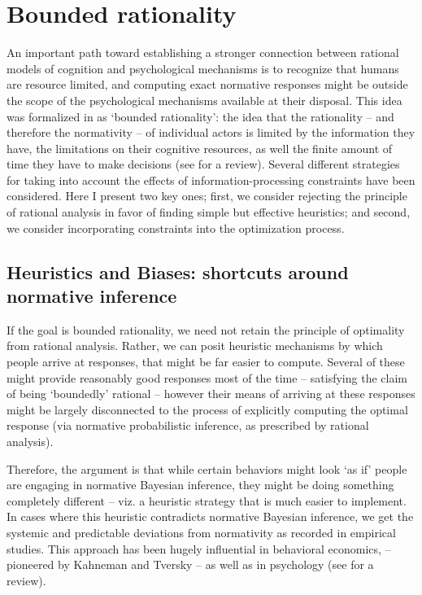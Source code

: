 \section{Bounded rationality}
\label{sec:psych_BR}

An important path toward establishing a stronger connection between rational models of cognition and psychological mechanisms is to recognize that humans are resource limited, and computing exact normative responses might be outside the scope of the psychological mechanisms available at their disposal. This idea was formalized in \citet{simon1955behavioral} as `bounded rationality': the idea that the rationality -- and therefore the normativity -- of individual actors is limited by the information they have, the limitations on their cognitive resources, as well the finite amount of time they have to make decisions (see \citet{russell2016rationality} for a review). Several different strategies for taking into account the effects of information-processing constraints have been considered. Here I present two key ones; first, we consider rejecting the principle of rational analysis in favor of finding simple but effective heuristics; and second, we consider incorporating constraints into the optimization process.

\subsection{Heuristics and Biases: shortcuts around normative inference}

If the goal is bounded rationality, we need not retain the principle of optimality from rational analysis. Rather, we can posit heuristic mechanisms by which people arrive at responses, that might be far easier to compute. Several of these might provide reasonably good responses most of the time -- satisfying the claim of being `boundedly' rational -- however their means of arriving at these responses might be largely disconnected to the process of explicitly computing the optimal response (via normative probabilistic inference, as prescribed by rational analysis).

Therefore, the argument is that while certain behaviors might look `as if' people are engaging in normative Bayesian inference, they might be doing something completely different -- viz. a heuristic strategy that is much easier to implement. In cases where this heuristic contradicts normative Bayesian inference, we get the systemic and predictable deviations from normativity as recorded in empirical studies. This approach has been hugely influential in behavioral economics, -- pioneered by Kahneman and Tversky\cite{tversky} -- as well as in psychology (see \citet{gigerenzer2002bounded} for a review). 


